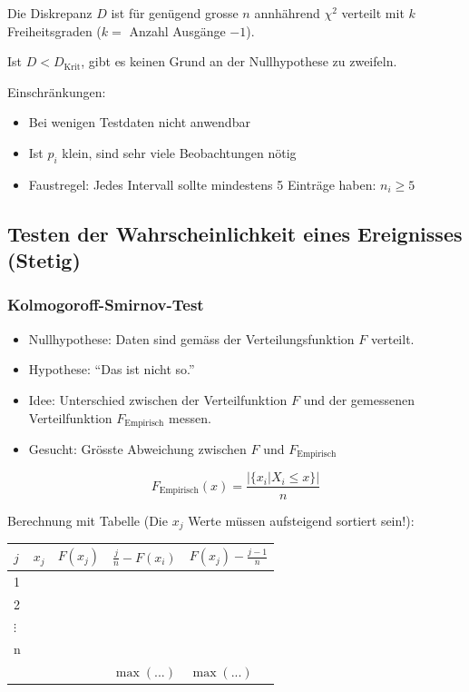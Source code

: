 Die Diskrepanz $D$ ist für genügend grosse $n$ annhährend $\chi^2$
verteilt mit $k$ Freiheitsgraden ($k = $ Anzahl Ausgänge $-1$).

Ist $D < D_{\text{Krit}}$, gibt es keinen Grund an der Nullhypothese zu
zweifeln.

Einschränkungen:
\begin{itemize}
  \item Bei wenigen Testdaten nicht anwendbar
  \item Ist $p_i$ klein, sind sehr viele Beobachtungen nötig
  \item Faustregel: Jedes Intervall sollte mindestens 5 Einträge haben:
    $n_i \geq 5$
\end{itemize}

\subsection{Testen der Wahrscheinlichkeit eines Ereignisses (Stetig)}
\subsubsection{Kolmogoroff-Smirnov-Test}
\begin{itemize}
  \item Nullhypothese: Daten sind gemäss der Verteilungsfunktion $F$
    verteilt.
  \item Hypothese: ``Das ist nicht so.''
  \item Idee: Unterschied zwischen der Verteilfunktion $F$
    und der gemessenen Verteilfunktion $F_{\text{Empirisch}}$ messen.
  \item Gesucht: Grösste Abweichung zwischen $F$ und $F_{\text{Empirisch}}$
\end{itemize}

\[ F_{\text{Empirisch}}(x) = \frac{|\{x_i | X_i \leq x\}|}{n} \]

Berechnung mit Tabelle (Die $x_j$ Werte müssen aufsteigend sortiert
sein!):

\begin{tabular}{|l|l|l|l|l|}
  \hline
  $j$        & $x_j$     & $F(x_j)$    & $\frac{j}{n}-F(x_i)$  & $F(x_j) - \frac{j-1}{n}$ \\
  \hline
  \hline
  1         &           &           &            &          \\
  2         &           &           &            &          \\
  $\vdots$  &           &           &            &          \\
  n         &           &           &            &          \\
  \hline
  \hline
          &           &  & $\operatorname{max}(...)$ & $\operatorname{max}(...)$ \\
  \hline
\end{tabular}


